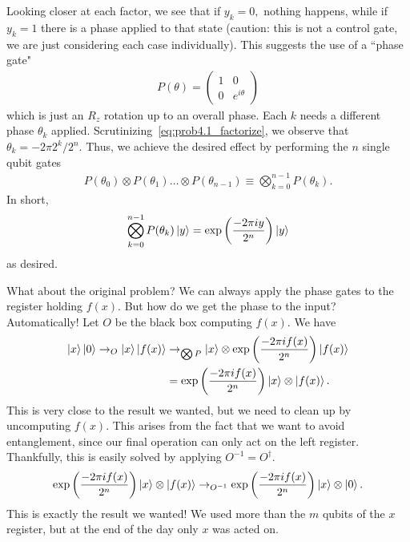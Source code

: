 \documentclass{book}
\begin{document}
    Looking closer at each factor, we see that if $y_k = 0,$ nothing happens, while if $y_k = 1$ there is a phase applied to that state (caution: this is not a control gate, we are just considering each case individually). This suggests the use of a ``phase gate"
    \begin{align}
        P(\theta) = \begin{pmatrix}
            1  & 0 \\
            0 & e^{i\theta}
        \end{pmatrix}
    \end{align}
    which is just an $R_z$ rotation up to an overall phase. Each $k$ needs a different phase $\theta_k$ applied. Scrutinizing~\eqref{eq:prob4.1_factorize}, we observe that $\theta_k = -2\pi 2^k/2^n$. Thus, we achieve the desired effect by performing the $n$ single qubit gates
    \begin{align}
        P(\theta_0)\otimes P(\theta_1) \dots \otimes P(\theta_{n-1}) \equiv \bigotimes_{k=0}^{n-1} P(\theta_k).
    \end{align}
    In short,
    \begin{align}
        \bigotimes_{k=0}^{n-1} P(\theta_k) \ket{y} = \exp\left(\frac{-2\pi i y}{2^n}\right) \ket{y}
    \end{align}
    as desired.

    What about the original problem? We can always apply the phase gates to the register holding $f(x)$. But how do we get the phase to the input? Automatically! Let $O$ be the black box computing $f(x)$. We have
    \begin{align}
    \begin{aligned}
        \ket{x}\ket{0} \rightarrow_O \ket{x}\ket{f(x)} &\rightarrow_{\bigotimes P} \ket{x} \otimes \exp\left(\frac{-2\pi i f(x)}{2^n}\right) \ket{f(x)} \\
        &= \exp\left(\frac{-2\pi i f(x)}{2^n}\right) \ket{x} \otimes \ket{f(x)}.
    \end{aligned}
    \end{align}
    This is very close to the result we wanted, but we need to clean up by uncomputing $f(x)$. This arises from the fact that we want to avoid entanglement, since our final operation can only act on the left register. Thankfully, this is easily solved by applying $O^{-1} = O^\dagger$.
    \begin{align}
        \exp\left(\frac{-2\pi i f(x)}{2^n}\right) \ket{x} \otimes \ket{f(x)} \rightarrow_{O^{-1}} \exp\left(\frac{-2\pi i f(x)}{2^n}\right) \ket{x} \otimes \ket{0}.
    \end{align}
    This is exactly the result we wanted! We used more than the $m$ qubits of the $x$ register, but at the end of the day only $x$ was acted on.
    
\end{document}
